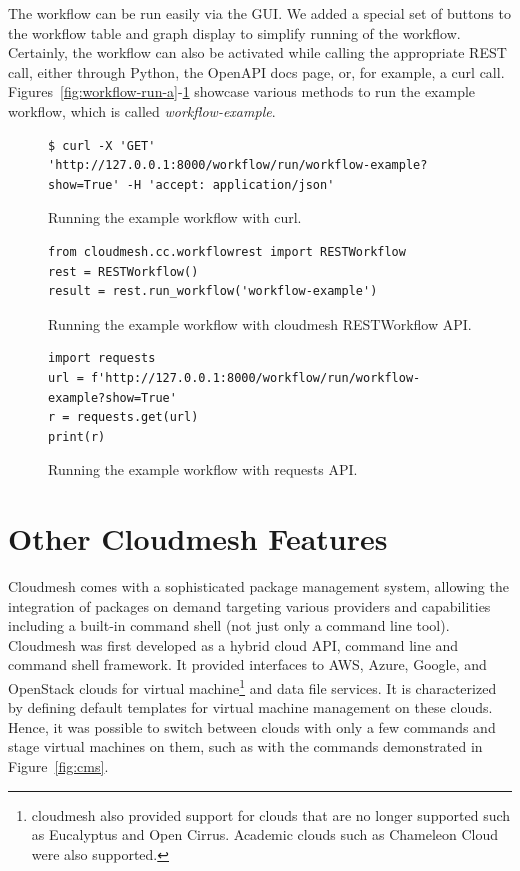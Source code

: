 \documentclass[sigplan,screen]{acmart}
\newcommand{\FILE}[1]{}
\begin{document}
The workflow can be run easily via the GUI. We added a special set of
buttons to the workflow table and graph display to simplify running of
the workflow. Certainly, the workflow can also be activated while
calling the appropriate REST call, either through Python, the OpenAPI
docs page, or, for example, a curl call.
Figures~\ref{fig:workflow-run-a}-\ref{fig:workflow-run-c}
showcase various methods to run the example workflow, which is called
{\em workflow-example}.


\begin{figure}[htb]

\begin{verbatim}
$ curl -X 'GET' 'http://127.0.0.1:8000/workflow/run/workflow-example?show=True' -H 'accept: application/json'
\end{verbatim}
\flushleft
\caption{\parindent0pt Running the example workflow with curl.}
\label{fig:workflow-run-a}
\bigskip

\begin{verbatim} 
from cloudmesh.cc.workflowrest import RESTWorkflow
rest = RESTWorkflow()
result = rest.run_workflow('workflow-example')
\end{verbatim}
\caption{Running the example workflow with cloudmesh RESTWorkflow API.}
\label{fig:workflow-run-b}
\bigskip

\begin{verbatim}
import requests
url = f'http://127.0.0.1:8000/workflow/run/workflow-example?show=True'
r = requests.get(url)
print(r)
\end{verbatim}

\caption{Running the example workflow with requests API.}
\label{fig:workflow-run-c}

\end{figure}









% 

\FILE{cloudmesh.tex}

\section{Other Cloudmesh Features}

Cloudmesh comes with a sophisticated package management system,
allowing the integration of packages on demand targeting various providers
and capabilities including a built-in command shell (not just only
a command line tool). Cloudmesh was first developed as a hybrid cloud
API, command line and command shell framework. It provided interfaces
to AWS, Azure, Google, and OpenStack clouds for virtual
machine\footnote{cloudmesh also provided support for clouds that are no
longer supported such as Eucalyptus and Open Cirrus. Academic clouds
such as Chameleon Cloud were also supported.} and data file services. It
is characterized by defining default templates for virtual machine
management on these clouds. Hence, it was possible to switch between clouds
with only a few commands and stage virtual machines on them, such
as with the commands demonstrated in Figure~\ref{fig:cms}.
\end{document}
